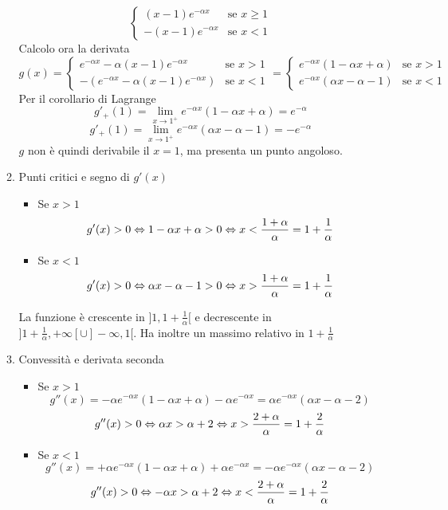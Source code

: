 \documentclass{article}
\begin{document}
\begin{enumerate}[label=\textbf{Esercizio 7.\arabic*.},itemindent=*]
\begin{enumerate}[label=\arabic*.,itemindent=*]
\[\begin{cases}
            (x-1)e^{-\alpha x}&\text{se } x\geq1\\
            -(x-1)e^{-\alpha x}&\text{se } x<1
        \end{cases}\]
        Calcolo ora la derivata
        \[g(x)=\begin{cases}
            e^{-\alpha x}-\alpha(x-1)e^{-\alpha x}&\text{se } x>1\\
            -(e^{-\alpha x}-\alpha(x-1)e^{-\alpha x})&\text{se } x<1
        \end{cases}=\begin{cases}
            e^{-\alpha x}(1-\alpha x+\alpha)&\text{se } x>1\\
            e^{-\alpha x}(\alpha x-\alpha-1)&\text{se } x<1
        \end{cases}\]
        Per il corollario di Lagrange
        \[g'_+(1)=\lim_{x\to 1^+}e^{-\alpha x}(1-\alpha x+\alpha)=e^{-\alpha}\]
        \[g'_+(1)=\lim_{x\to 1^+}e^{-\alpha x}(\alpha x-\alpha-1)=-e^{-\alpha}\]
        $g$ non è quindi derivabile il $x=1$, ma presenta un punto angoloso.
        \item Punti critici e segno di $g'(x)$
        \begin{itemize}
            \item Se $x>1$
            \[g'(x)>0\Leftrightarrow1-\alpha x+\alpha>0\Leftrightarrow x<\frac{1+\alpha}{\alpha}=1+\frac{1}{\alpha}\] 
            \item Se $x<1$
            \[g'(x)>0\Leftrightarrow\alpha x-\alpha-1>0\Leftrightarrow x>\frac{1+\alpha}{\alpha}=1+\frac{1}{\alpha}\] 
        \end{itemize}
        La funzione è crescente in $]1,1+\frac{1}{\alpha}[$ e decrescente in $]1+\frac{1}{\alpha}, +\infty[\cup]-\infty, 1[$. Ha inoltre un massimo relativo in $1+\frac{1}{\alpha}$
        \item Convessità e derivata seconda
        \begin{itemize}
            \item Se $x>1$
            \[g''(x)=-\alpha e^{-\alpha x}(1-\alpha x +\alpha)-\alpha e^{-\alpha x}=\alpha e^{-\alpha x}(\alpha x -\alpha -2)\]
            \[g''(x)>0\Leftrightarrow\alpha x > \alpha +2\Leftrightarrow x>\frac{2+\alpha}{\alpha}=1+\frac{2}{\alpha}\] 
            \item Se $x<1$
            \[g''(x)=+\alpha e^{-\alpha x}(1-\alpha x +\alpha)+\alpha e^{-\alpha x}=-\alpha e^{-\alpha x}(\alpha x -\alpha -2)\]
            \[g''(x)>0\Leftrightarrow-\alpha x > \alpha +2\Leftrightarrow x<\frac{2+\alpha}{\alpha}=1+\frac{2}{\alpha}\] 
        \end{itemize}

\end{enumerate}
\end{enumerate}
\end{document}
